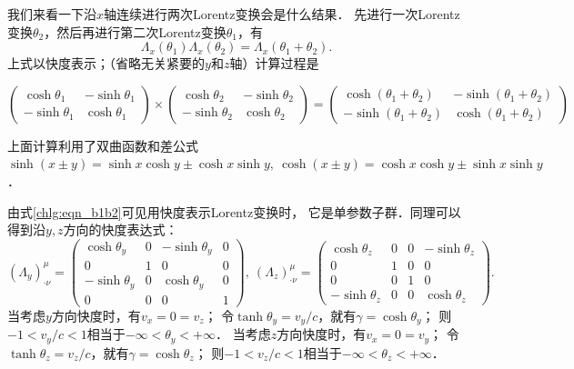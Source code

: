 我们来看一下沿$x$轴连续进行两次Lorentz变换会是什么结果．
先进行一次Lorentz变换$\theta_2$，然后再进行第二次Lorentz变换$\theta_1$，有
\begin{equation}\label{chlg:eqn_b1b2}
    \Lambda_x(\theta_1) \Lambda_x(\theta_2) = \Lambda_x(\theta_1+\theta_2).
\end{equation}
上式以快度表示；（省略无关紧要的$y$和$z$轴）计算过程是
\begin{small}
\[\begin{pmatrix}
    \cosh\theta_1  & -\sinh\theta_1 \\
    -\sinh\theta_1 & \cosh\theta_1  
\end{pmatrix} \times
\begin{pmatrix}
    \cosh\theta_2  & -\sinh\theta_2  \\
    -\sinh\theta_2 & \cosh\theta_2   
\end{pmatrix} = 
\begin{pmatrix}
    \cosh(\theta_1+\theta_2)  & -\sinh(\theta_1+\theta_2)  \\
    -\sinh(\theta_1+\theta_2) & \cosh(\theta_1+\theta_2) 
\end{pmatrix} \]
\end{small}
上面计算利用了双曲函数和差公式
$\sinh(x \pm y) = \sinh x \cosh y \pm  \cosh x \sinh y, \ 
\cosh(x \pm y) = \cosh x \cosh y \pm  \sinh x \sinh y$．

由式\eqref{chlg:eqn_b1b2}可见用快度表示Lorentz变换时，
它是单参数子群．同理可以得到沿$y,z$方向的快度表达式：
\begin{equation*}  %
    (\Lambda_y)^{\mu}_{\cdot \nu} = 
    \begin{pmatrix}
        \cosh\theta_y  & 0 & -\sinh\theta_y & 0 \\
        0 & 1  & 0 & 0 \\
        -\sinh\theta_y & 0 & \cosh\theta_y & 0 \\
        0 & 0 & 0 & 1 
    \end{pmatrix},\
    (\Lambda_z)^{\mu}_{\cdot \nu} = 
    \begin{pmatrix}
        \cosh\theta_z  & 0 & 0 & -\sinh\theta_z \\
        0 & 1  & 0 & 0 \\
        0 & 0 & 1 & 0 \\
        -\sinh\theta_z & 0 & 0 & \cosh\theta_z
    \end{pmatrix} .
\end{equation*}
当考虑$y$方向快度时，有$v_x=0=v_z$；
令$\tanh \theta_y=v_y/c$，就有$\gamma = \cosh \theta_y$；
则$-1<v_y/c<1$相当于$-\infty < \theta_y <+\infty$．
当考虑$z$方向快度时，有$v_x=0=v_y$；
令$\tanh \theta_z=v_z/c$，就有$\gamma = \cosh \theta_z$；
则$-1<v_z/c<1$相当于$-\infty < \theta_z <+\infty$．





